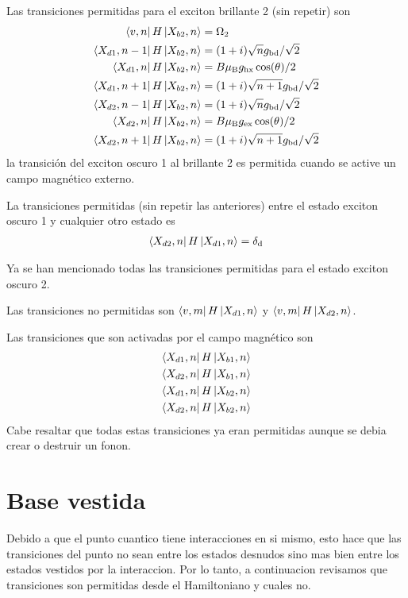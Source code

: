 \documentclass[../main.tex]{subfiles}
\begin{document}
Las transiciones permitidas para el exciton brillante 2 (sin repetir) son
\begin{align*}
    \bra{v,n}H\ket{X_{b2},n} &= \Omega_2\\
    \bra{X_{d1},n-1}H\ket{X_{b2},n} &= (1+i)\sqrt{n} g_\text{bd}/\sqrt{2}\\
    \bra{X_{d1},n}H\ket{X_{b2},n} &= B \mu_\text{B} g_\text{hx} \cos(\theta)/2\\
    \bra{X_{d1},n+1}H\ket{X_{b2},n} &= (1+i)\sqrt{n+1}g_\text{bd}/\sqrt{2}\\
    \bra{X_{d2},n-1}H\ket{X_{b2},n} &= (1+i)\sqrt{n} g_\text{bd}/\sqrt{2}\\
    \bra{X_{d2},n}H\ket{X_{b2},n} &= B \mu_\text{B} g_\text{ex} \cos(\theta)/2\\
    \bra{X_{d2},n+1}H\ket{X_{b2},n} &= (1+i)\sqrt{n+1}g_\text{bd}/\sqrt{2}
\end{align*}
la transición del exciton oscuro 1 al brillante 2 es permitida cuando se active un campo magnético externo.

La transiciones permitidas (sin repetir las anteriores) entre el estado exciton oscuro 1 y cualquier otro estado es
\begin{align*}
    \bra{X_{d2},n}H\ket{X_{d1},n} = \delta_\text{d}
\end{align*}

Ya se han mencionado todas las transiciones permitidas para el estado exciton oscuro 2.

Las transiciones no permitidas son $\bra{v,m}H\ket{X_{d1},n}$ y $\bra{v,m}H\ket{X_{d2},n}$.

Las transiciones que son activadas por el campo magnético son
\begin{align*}
 \bra{X_{d1},n}H\ket{X_{b1},n}\\
 \bra{X_{d2},n}H\ket{X_{b1},n}\\
 \bra{X_{d1},n}H\ket{X_{b2},n}\\
 \bra{X_{d2},n}H\ket{X_{b2},n}
\end{align*}
Cabe resaltar que todas estas transiciones ya eran permitidas aunque se debia crear o destruir un fonon.
\section{Base vestida}
Debido a que el punto cuantico tiene interacciones en si mismo, esto hace que las transiciones del punto no sean entre los estados desnudos sino mas bien entre los estados vestidos por la interaccion. Por lo tanto, a continuacion revisamos que transiciones son permitidas desde el Hamiltoniano y cuales no.
\end{document}
